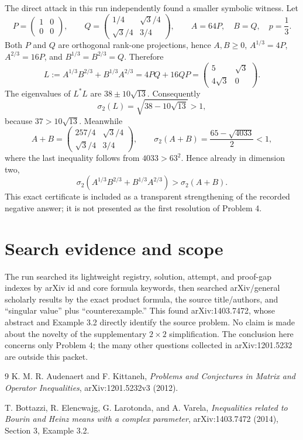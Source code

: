 \documentclass[11pt]{article}
\begin{document}
The direct attack in this run independently found a smaller symbolic witness. Let
\[
 P=\begin{pmatrix}1&0\\0&0\end{pmatrix},\qquad
 Q=\begin{pmatrix}1/4&\sqrt3/4\\ \sqrt3/4&3/4\end{pmatrix},\qquad
 A=64P,\quad B=Q,\quad p=\frac13.
\]
Both $P$ and $Q$ are orthogonal rank-one projections, hence $A,B\geq0$, $A^{1/3}=4P$, $A^{2/3}=16P$, and $B^{1/3}=B^{2/3}=Q$. Therefore
\[
 L:=A^{1/3}B^{2/3}+B^{1/3}A^{2/3}
 =4PQ+16QP
 =\begin{pmatrix}5&\sqrt3\\4\sqrt3&0\end{pmatrix}.
\]
The eigenvalues of $L^*L$ are $38\pm10\sqrt{13}$. Consequently
\[
 \sigma_2(L)=\sqrt{38-10\sqrt{13}}>1,
\]
because $37>10\sqrt{13}$. Meanwhile
\[
 A+B=\begin{pmatrix}257/4&\sqrt3/4\\ \sqrt3/4&3/4\end{pmatrix},
 \qquad
 \sigma_2(A+B)=\frac{65-\sqrt{4033}}2<1,
\]
where the last inequality follows from $4033>63^2$. Hence already in dimension two,
\[
 \sigma_2\!\left(A^{1/3}B^{2/3}+B^{1/3}A^{2/3}\right)
 >\sigma_2(A+B).
\]
This exact certificate is included as a transparent strengthening of the recorded negative answer; it is not presented as the first resolution of Problem 4.

\section*{Search evidence and scope}

The run searched its lightweight registry, solution, attempt, and proof-gap indexes by arXiv id and core formula keywords, then searched arXiv/general scholarly results by the exact product formula, the source title/authors, and ``singular value'' plus ``counterexample.'' This found arXiv:1403.7472, whose abstract and Example 3.2 directly identify the source problem. No claim is made about the novelty of the supplementary $2\times2$ simplification. The conclusion here concerns only Problem 4; the many other questions collected in arXiv:1201.5232 are outside this packet.

\begin{thebibliography}{9}
K. M. R. Audenaert and F. Kittaneh,
\emph{Problems and Conjectures in Matrix and Operator Inequalities},
arXiv:1201.5232v3 (2012).

T. Bottazzi, R. Elencwajg, G. Larotonda, and A. Varela,
\emph{Inequalities related to Bourin and Heinz means with a complex parameter},
arXiv:1403.7472 (2014), Section 3, Example 3.2.
\end{thebibliography}
\end{document}
